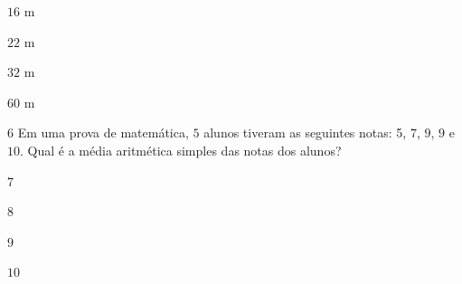 \begin{escolha}
\item $16$ m
\item $22$ m
\item $32$ m
\item $60$ m
\end{escolha}



\num{6}  Em uma prova de matemática, $5$ alunos tiveram as seguintes notas: 5, $7$, $9$, $9$ e $10$. Qual é a média aritmética simples das notas dos alunos?

\begin{escolha}
\item $7$
\item $8$
\item $9$
\item $10$
\end{escolha}



